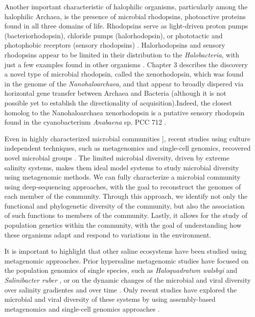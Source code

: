 Another important characteristic of halophilic organisms, particularly among the halophilic Archaea, is the presence of microbial rhodopsins, photoactive proteins found in all three domains of life. Rhodopsins serve as light-driven proton pumps (bacteriorhodopsin), chloride pumps (halorhodopsin), or phototactic and photophobic receptors (sensory rhodopsins) \cite{Brown:2013ic}. Halorhodopsins and sensory rhodopsins appear to be limited in their distribution to the \textit{Halobacteria}, with just a few examples found in other organisms \cite{Sharma:2006kn}. Chapter 3 describes the discovery a novel type of microbial rhodopsin, called the xenorhodopsin, which was found in the genome of the \textit{Nanohaloarchaea}, and that appear to broadly dispered via horizontal gene transfer between Archaea and Bacteria (although it is not possible yet to establish the directionality of acquisition).Indeed, the closest homolog to the Nanohaloarchaea xenorhodopsin is a putative sensory rhodopsin found in the cyanobacterium \textit{Anabaena} sp. PCC 712 \cite{Vogeley:2004vh,Ugalde:2011fw}.

Even in highly characterized microbial communities  \cite{Oren:2008ej,Oren:2012bg}], recent studies using culture independent techniques, such as metagenomics and single-cell genomics, recovered novel microbial groups \cite{Narasingarao:2012kp,Ghai:2011hn,LopezPerez:2013db}. The limited microbial diversity, driven by extreme salinity systems, makes them ideal model systems to study microbial diversity using metagenomic methods. We can fully characterize a microbial community using deep-sequencing approaches, with the goal to reconstruct the genomes of each member of the community. Through this approach, we identify not only the functional and phylogenetic diversity of the community, but also the association of such functions to members of the community. Lastly, it allows for the study of population genetics within the community, with the goal of understanding how these organisms adapt and respond to variations in the environment.

It is important to highlight that other saline ecosystems have been studied using metagenomic approaches. Prior hypersaline metagenomic studies have focused on the population genomics of single species, such as \textit{Haloquadratum walsbyi} \cite{Legault:2006kh} and \textit{Salinibacter ruber} \cite{Pasic:2009bo}, or on the dynamic changes of the microbial and viral diversity over salinity gradientes and over time \cite{Willner:2009iv,RodriguezBrito:2010in}. Only recent studies have explored the microbial and viral diversity of these systems by using assembly-based metagenomics and single-cell genomics approaches \cite{Narasingarao:2012kp,Podell:2013kx,Ghai:2011hn,Ghai:2012fb,Emerson:2012gh,Emerson:tk}.

